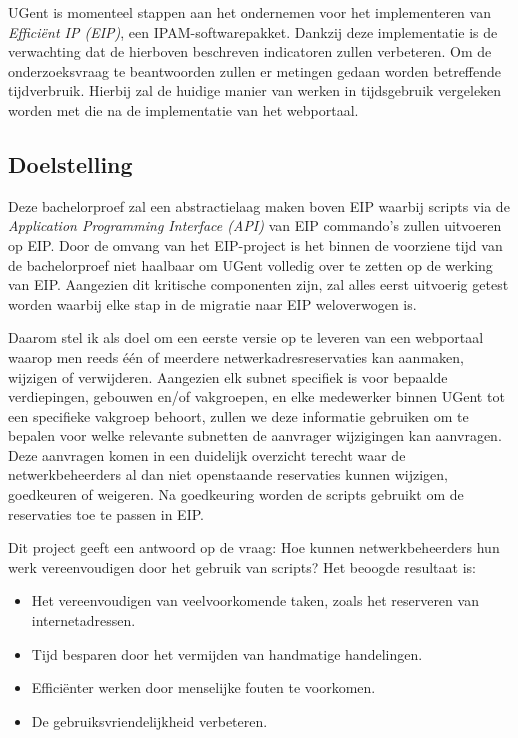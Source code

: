UGent is momenteel stappen aan het ondernemen voor het implementeren van \textit{Efficiënt IP (EIP)}, een IPAM-softwarepakket. Dankzij deze implementatie is de verwachting dat de hierboven beschreven indicatoren zullen verbeteren. Om de onderzoeksvraag te beantwoorden zullen er metingen gedaan worden betreffende tijdverbruik. Hierbij zal de huidige manier van werken in tijdsgebruik vergeleken worden met die na de implementatie van het webportaal.

\subsection{Doelstelling}
\label{voorstel:doelstelling}
Deze bachelorproef zal een abstractielaag maken boven EIP waarbij scripts via de \textit{Application Programming Interface (API)} van EIP commando's zullen uitvoeren op EIP.
Door de omvang van het EIP-project is het binnen de voorziene tijd van de bachelorproef niet haalbaar om UGent volledig over te zetten op de werking van EIP. Aangezien dit kritische componenten zijn, zal alles eerst uitvoerig getest worden waarbij elke stap in de migratie naar EIP weloverwogen is.

Daarom stel ik als doel om een eerste versie op te leveren van een webportaal waarop men reeds één of meerdere netwerkadresreservaties kan aanmaken, wijzigen of verwijderen. Aangezien elk subnet specifiek is voor bepaalde verdiepingen, gebouwen en/of vakgroepen, en elke medewerker binnen UGent tot een specifieke vakgroep behoort, zullen we deze informatie gebruiken om te bepalen voor welke relevante subnetten de aanvrager wijzigingen kan aanvragen. Deze aanvragen komen in een duidelijk overzicht terecht waar de netwerkbeheerders al dan niet openstaande reservaties kunnen wijzigen, goedkeuren of weigeren. Na goedkeuring worden de scripts gebruikt om de reservaties toe te passen in EIP.

Dit project geeft een antwoord op de vraag: Hoe kunnen netwerkbeheerders hun werk vereenvoudigen door het gebruik van scripts?
Het beoogde resultaat is:
\begin{itemize}
    \item Het vereenvoudigen van veelvoorkomende taken, zoals het reserveren van internetadressen.
    \item Tijd besparen door het vermijden van handmatige handelingen.
    \item Efficiënter werken door menselijke fouten te voorkomen.
    \item De gebruiksvriendelijkheid verbeteren.
\end{itemize}

